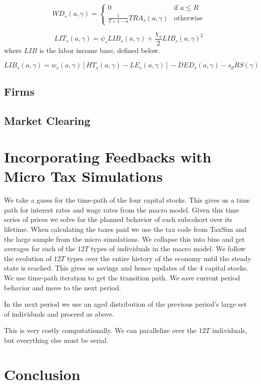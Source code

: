\documentclass[letterpaper,12pt]{article}
\theoremstyle{definition}
\numberwithin{equation}{section}
\begin{document}
\begin{spacing}{1.5}
  \begin{equation}
  WD_s(a,\gamma) = \left\{ \begin{matrix} 0 & \text{if }a\le R \\ \frac{1}{T+1-a} TRA_s(a,\gamma)& \text{otherwise} \end{matrix}\right.
  \end{equation}

  \begin{equation}
  LIT_s(a,\gamma) = \psi_sLIB_s(a,\gamma) + \frac{\chi_s}{2} LIB_s(a,\gamma)^2
  \end{equation}
  where $LIB$ is the labor income base, defined below.

  \begin{equation}
  LIB_s(a,\gamma) = w_s(a,\gamma) [HT_s(a,\gamma) - LE_s(a,\gamma)] - DED_s(a,\gamma) - s_d RS(\gamma)
  \end{equation}

  \subsection{Firms}

  \subsection{Market Clearing}

\section{Incorporating Feedbacks with Micro Tax Simulations}\label{SecMicro}

  We take a guess for the time-path of the four capital stocks.  This gives us a time path for interest rates and wage rates from the macro model.  Given this time series of prices we solve for the planned behavior of each subcohort over its lifetime.  When calculating the taxes paid we use the tax code from TaxSim and the large sample from the micro simulations.  We collapse this into bins and get averages for each of the $12T$ types of individuals in the macro model.  We follow the evolution of $12T$ types over the entire history of the economy until the steady state is reached.  This gives us savings and hence updates of the 4 capital stocks.  We use time-path iteration to get the transition path.  We save current period behavior and move to the next period.

  In the next period we use an aged distribution of the previous period's large set of individuals and proceed as above.

  This is very costly computationally.  We can parallelize over the $12T$ individuals, but everything else must be serial.



\section{Conclusion}\label{SecConclusion}


\end{spacing}
\end{document}
